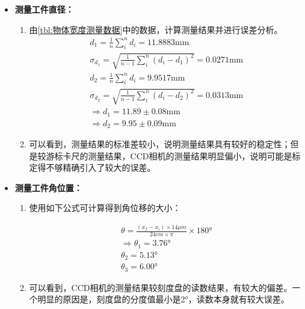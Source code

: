 \documentclass[dvipsnames, svgnames,a4paper,11pt]{article}
\begin{document}
		\begin{itemize}
			\item \textbf{测量工件直径：}

				\begin{enumerate}
					\item 由\cref{tbl:物体宽度测量数据}中的数据，计算测量结果并进行误差分析。
						\begin{align*}
							d_1 = \frac{1}{n}\sum_{i}^{n}d_i = 11.8883 \mathrm{mm}	\\
							\sigma_{d_1} = \sqrt{\frac{1}{n-1} \sum_{i}^{n}(d_i - d_1)^2} = 0.0271 \mathrm{mm}	\\
							d_2 = \frac{1}{n}\sum_{i}^{n}d_i = 9.9517 \mathrm{mm}	\\
							\sigma_{d_2} = \sqrt{\frac{1}{n-1} \sum_{i}^{n}(d_i - d_2)^2} = 0.0313 \mathrm{mm}	\\
							\Rightarrow d_1 = 11.89 \pm 0.08 \mathrm{mm}	\\
							\Rightarrow d_2 = 9.95 \pm 0.09 \mathrm{mm}
						\end{align*}

					\item 可以看到，测量结果的标准差较小，说明测量结果具有较好的稳定性；但是较游标卡尺的测量结果，CCD相机的测量结果明显偏小，说明可能是标定得不够精确引入了较大的误差。
				\end{enumerate}

			\item \textbf{测量工件角位置：}
			
				\begin{enumerate}
					\item 使用如下公式可计算得到角位移的大小：

						\begin{align*}
							\theta = \frac{(x_f - x_i) \times 14 \mu m}{24 cm \times \pi} \times 180°	\\
							\Rightarrow \theta_1 = 3.76°	\\
							\theta_2 = 5.13°	\\
							\theta_3 = 6.00°	
						\end{align*}

					\item 可以看到，CCD相机的测量结果较刻度盘的读数结果，有较大的偏差。一个明显的原因是，刻度盘的分度值最小是2°，读数本身就有较大误差。
				\end{enumerate}
		\end{itemize}
\end{document}
